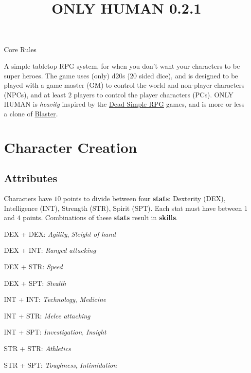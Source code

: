 \documentclass[11pt]{article}
\title{\vspace{-4ex}ONLY HUMAN 0.2.1\vspace{-6.5ex}}
\date{}
\begin{document}
\begin{multicols}{3}
  \maketitle

  \begin{center}\LARGE Core Rules\end{center}

  A simple tabletop RPG system, for when you don't want your characters to be super heroes. The game uses (only) d20s ($20$ sided dice), and is designed to be played with a game master (GM) to control the world and non-player characters (NPCs), and at least $2$ players to control the player characters (PCs). ONLY HUMAN is \textit{heavily} inspired by the \href{https://deadsimplerpg.wordpress.com/about/}{Dead Simple RPG} games, and is more or less a clone of \href{https://deadsimplerpg.wordpress.com/category/blaster-sf-rpg/}{Blaster}.

  \section*{Character Creation}

  \subsection*{Attributes}

  Characters have $10$ points to divide between four \textbf{stats}: Dexterity (DEX), Intelligence (INT), Strength (STR), Spirit (SPT). Each stat must have between $1$ and $4$ points. Combinations of these \textbf{stats} result in \textbf{skills}.

  \begin{multicols}{2}
    DEX + DEX: ​\textit{Agility​},​ \textit{Sleight of hand}

    DEX + INT: \textit{​Ranged attacking​}

    DEX + STR: ​\textit{Speed}

    DEX + SPT: ​\textit{Stealth}

    INT + INT: ​\textit{Technology​},​ \textit{Medicine}

    INT + STR: ​\textit{Melee attacking}

    INT + SPT: \textit{Investigation}, \textit{Insight}

    STR + STR: \textit{​Athletics}

    STR + SPT: \textit{​Toughness}, \textit{Intimidation}


\end{multicols}
\end{multicols}
\end{document}

